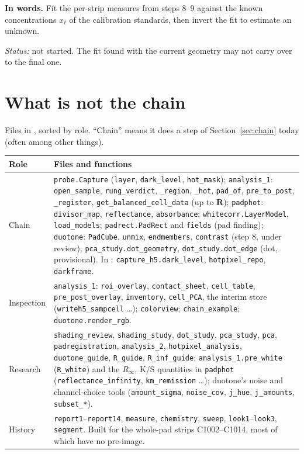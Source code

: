 \documentclass[11pt,letter]{article}
\newcommand{\file}[1]{\texttt{\seqsplit{#1}}}
\newcommand{\code}[1]{\texttt{#1}}
\newcommand{\status}[1]{\par\noindent\textit{Status:} #1\par}
\newcommand{\mR}{\mathbf{R}}   %
\begin{document}
\textbf{In words.}  Fit the per-strip measures from steps 8--9 against the
known concentrations $x_\ell$ of the calibration standards, then invert the
fit to estimate an unknown.

\status{not started.  The fit found with the current geometry may not carry
over to the final one.}

\section{What is not the chain}
\label{sec:inventory}

Files in \file{desktop/padanalysis/}, sorted by role.  ``Chain'' means it
does a step of Section~\ref{sec:chain} today (often among other things).

\medskip
\begin{tabular}{@{}L{2.6cm}L{12.2cm}@{}}
\toprule
Role & Files and functions \\
\midrule
Chain &
  \code{probe.Capture} (\code{layer}, \code{dark\_level}, \code{hot\_mask});
  \code{analysis\_1}: \code{open\_sample}, \code{rung\_verdict},
  \code{\_region}, \code{\_hot}, \code{pad\_of}, \code{pre\_to\_post},
  \code{\_register}, \code{get\_balanced\_cell\_data} (up to $\mR$);
  \code{padphot}: \code{divisor\_map}, \code{reflectance},
  \code{absorbance};
  \code{whitecorr.LayerModel}, \code{load\_models};
  \code{padrect.PadRect} and \code{fields} (pad finding);
  \code{duotone}: \code{PadCube}, \code{unmix}, \code{endmembers},
  \code{contrast} (step 8, under review);
  \code{pca\_study.dot\_geometry}, \code{dot\_study.dot\_edge} (dot, provisional).
  In \file{src/}: \code{capture\_h5.dark\_level}, \code{hotpixel\_repo},
  \code{darkframe}. \\
\midrule
Inspection &
  \code{analysis\_1}: \code{roi\_overlay}, \code{contact\_sheet},
  \code{cell\_table}, \code{pre\_post\_overlay}, \code{inventory},
  \code{cell\_PCA}, the interim store (\code{writeh5\_sampcell} \ldots);
  \code{colorview}; \code{chain\_example}; \code{duotone.render\_rgb}. \\
\midrule
Research &
  \code{shading\_review}, \code{shading\_study}, \code{dot\_study},
  \code{pca\_study}, \code{pca}, \code{padregistration},
  \code{analysis\_2}, \code{hotpixel\_analysis}, \code{duotone\_guide},
  \code{R\_guide}, \code{R\_inf\_guide};
  \code{analysis\_1.pre\_white} (\code{R\_white}) and the $R_\infty$,
  K/S quantities in \code{padphot}
  (\code{reflectance\_infinity}, \code{km\_remission} \ldots); duotone's
  noise and channel-choice tools (\code{amount\_sigma}, \code{noise\_cov},
  \code{j\_hue}, \code{j\_amounts}, \code{subset\_*}). \\
\midrule
History &
  \code{report1}--\code{report14}, \code{measure}, \code{chemistry},
  \code{sweep}, \code{look1}--\code{look3}, \code{segment}.  Built for the
  whole-pad strips C1002--C1014, most of which have no pre-image. \\
\bottomrule
\end{tabular}
\end{document}
